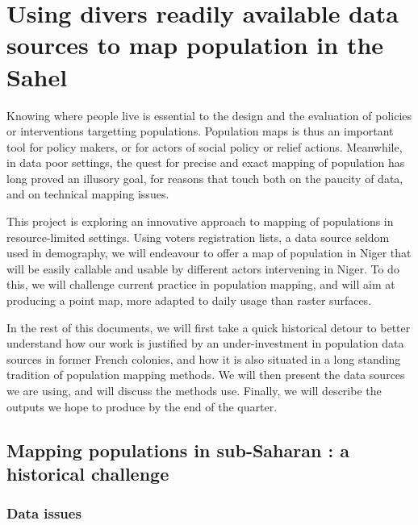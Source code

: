 \section[Using voters list to map population in the Sahel]{Using divers readily available data sources  to map population in the Sahel}



Knowing where people live is essential to the design and the evaluation of policies or interventions targetting populations. Population maps is thus an important tool for policy makers, or for actors of social policy or relief actions. Meanwhile, in data poor settings, the quest for precise and exact mapping of population has long proved an illusory goal, for reasons that touch both on the paucity of data, and on technical mapping issues.

This  project is exploring an innovative approach to mapping of populations in resource-limited settings. Using voters registration lists, a data source seldom used in demography, we will endeavour to offer a map of population in Niger that will be easily callable and usable by different actors intervening in Niger. To do this, we will challenge current practice in population mapping, and will aim at producing a point map, more adapted to daily usage than raster surfaces.

In the rest of this documents, we will first take a quick historical detour to better understand how our work is justified by an under-investment in population data sources in former French colonies, and how it is also situated in a long standing tradition of population mapping methods. We will then present the data sources we are using, and will discuss the methods use. Finally, we will describe the outputs we hope to produce by the end of the quarter.


\subsection{Mapping populations in sub-Saharan : a historical challenge}

\subsubsection{Data issues}

